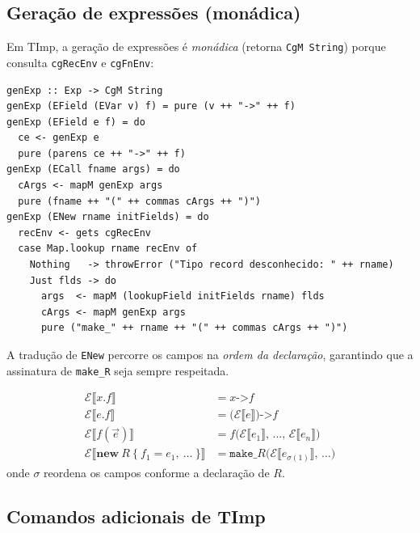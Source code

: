 \subsection{Geração de expressões (monádica)}

Em TImp, a geração de expressões é \emph{monádica} (retorna \texttt{CgM
String}) porque consulta \texttt{cgRecEnv} e \texttt{cgFnEnv}:

\begin{verbatim}
genExp :: Exp -> CgM String
genExp (EField (EVar v) f) = pure (v ++ "->" ++ f)
genExp (EField e f) = do
  ce <- genExp e
  pure (parens ce ++ "->" ++ f)
genExp (ECall fname args) = do
  cArgs <- mapM genExp args
  pure (fname ++ "(" ++ commas cArgs ++ ")")
genExp (ENew rname initFields) = do
  recEnv <- gets cgRecEnv
  case Map.lookup rname recEnv of
    Nothing   -> throwError ("Tipo record desconhecido: " ++ rname)
    Just flds -> do
      args  <- mapM (lookupField initFields rname) flds
      cArgs <- mapM genExp args
      pure ("make_" ++ rname ++ "(" ++ commas cArgs ++ ")")
\end{verbatim}

A tradução de \texttt{ENew} percorre os campos na \emph{ordem da declaração},
garantindo que a assinatura de \texttt{make\_R} seja sempre respeitada.

\begin{Definition}\label{def:timp-exp}
\begin{align*}
\mathcal{E}\llbracket x.f \rrbracket
  &= x \texttt{->} f \\
\mathcal{E}\llbracket e.f \rrbracket
  &= \texttt{(}\mathcal{E}\llbracket e\rrbracket\texttt{)->}f \\
\mathcal{E}\llbracket f(\vec{e}) \rrbracket
  &= f\texttt{(}\mathcal{E}\llbracket e_1\rrbracket\texttt{,\ \ldots,\ }\mathcal{E}\llbracket e_n\rrbracket\texttt{)} \\
\mathcal{E}\llbracket \mathbf{new}\ R\ \{\ f_1 = e_1,\ \ldots\ \} \rrbracket
  &= \texttt{make\_}R\texttt{(}\mathcal{E}\llbracket e_{\sigma(1)}\rrbracket\texttt{,\ \ldots)}
\end{align*}
onde $\sigma$ reordena os campos conforme a declaração de $R$.
\end{Definition}

\subsection{Comandos adicionais de TImp}

